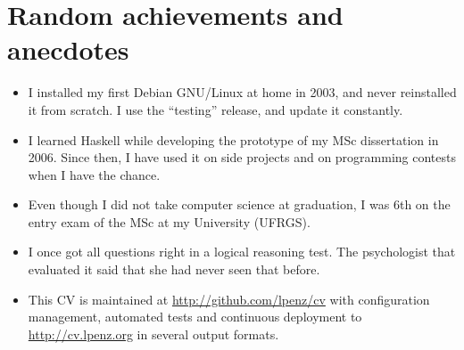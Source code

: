 \documentclass[margin,line]{resume}
\begin{document}
\begin{resume}
\begin{tabular}{rl}
    \end{tabular}


    \section{\mysidestyle Random achievements and anecdotes}

    \begin{itemize}
        
        \item I installed my first Debian GNU/Linux at home in 2003, and never
reinstalled it from scratch. I use the ``testing'' release, and update
it constantly.

        
        \item I learned Haskell while developing the prototype of my MSc dissertation
in 2006. Since then, I have used it on side projects and on programming
contests when I have the chance.

        
        \item Even though I did not take computer science at graduation, I was 6th on
the entry exam of the MSc at my University (UFRGS).

        
        \item I once got all questions right in a logical reasoning test. The
psychologist that evaluated it said that she had never seen that before.

        
        \item This CV is maintained at \url{http://github.com/lpenz/cv} with
configuration management, automated tests and continuous deployment to
\url{http://cv.lpenz.org} in several output formats.

        
    \end{itemize}
\end{resume}
\end{document}
